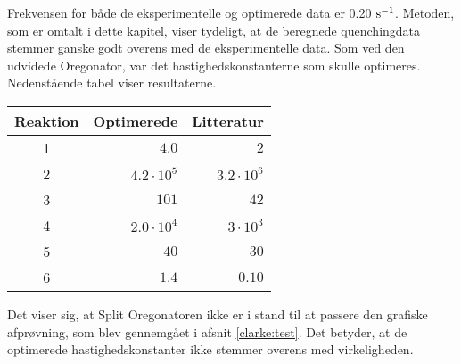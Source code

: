 \noindent
Frekvensen for b{\aa}de de eksperimentelle og optimerede
data er 0.20 ${\rm s}^{-1}$. Metoden, som er omtalt i dette
kapitel, viser tydeligt, at de beregnede quenchingdata
stemmer ganske godt overens med de eksperimentelle data.
Som ved den udvidede Oregonator, var det
hastighedskonstanterne som skulle optimeres.
Nedenst{\aa}ende tabel viser resultaterne.

\begin{center}
\begin{tabular}{crr}
Reaktion & Optimerede      & Litteratur \\ \hline
1        & $4.0$           & $2$ \\
2        & $4.2\cdot 10^5$ & $3.2\cdot 10^6$ \\
3        & $101$           & $42$ \\
4        & $2.0\cdot 10^4$ & $3\cdot 10^3$ \\
5        & $40$            & $30$ \\
6        & $1.4$           & $0.10$ \\ \hline
\end{tabular}
\end{center}

Det viser sig, at Split Oregonatoren ikke er i stand til at
passere den grafiske afpr{\o}vning, som blev gennemg{\aa}et
i afsnit \ref{clarke:test}. Det betyder, at de optimerede
hastighedskonstanter ikke stemmer overens med
virkeligheden.
